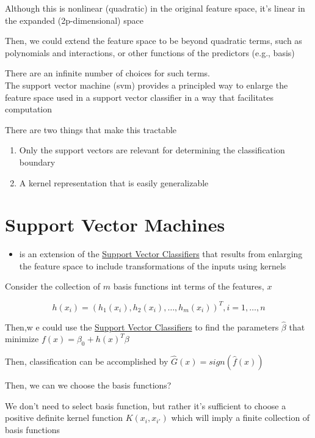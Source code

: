 \documentclass[
]{book}
\providecommand{\tightlist}{%
  \setlength{\itemsep}{0pt}\setlength{\parskip}{0pt}}
\begin{document}
Although this is nonlinear (quadratic) in the original feature space, it's linear in the expanded (2p-dimensional) space

Then, we could extend the feature space to be beyond quadratic terms, such as polynomials and interactions, or other functions of the predictors (e.g., basis)

There are an infinite number of choices for such terms.\\
The support vector machine (svm) provides a principled way to enlarge the feature space used in a support vector classifier in a way that facilitates computation

There are two things that make this tractable

\begin{enumerate}
\def\labelenumi{\arabic{enumi}.}
\tightlist
\item
  Only the support vectors are relevant for determining the classification boundary
\item
  A kernel representation that is easily generalizable
\end{enumerate}

\hypertarget{support-vector-machines}{%
\section{Support Vector Machines}\label{support-vector-machines}}

\begin{itemize}
\tightlist
\item
  is an extension of the \protect\hyperlink{support-vector-classifiers}{Support Vector Classifiers} that results from enlarging the feature space to include transformations of the inputs using kernels
\end{itemize}

Consider the collection of \(m\) basis functions int terms of the features, \(x\)

\[
h(x_i) = (h_1(x_i), h_2(x_i), \dots, h_m (x_i))^T, i = 1, \dots, n
\]

Then,w e could use the \protect\hyperlink{support-vector-classifiers}{Support Vector Classifiers} to find the parameters \(\hat{\beta}\) that minimize \(f(x) = \beta_0 + h(x)^T \beta\)

Then, classification can be accomplished by \(\hat{G}(x) = sign (\hat{f}(x))\)

Then, we can we choose the basis functions?

We don't need to select basis function, but rather it's sufficient to choose a positive definite kernel function \(K(x_i, x_{i'})\) which will imply a finite collection of basis functions
\end{document}
